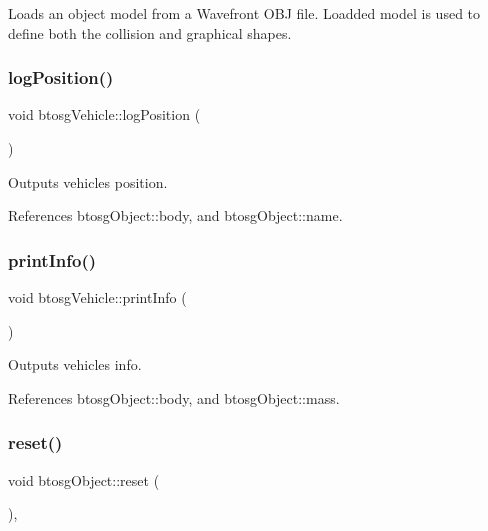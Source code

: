 Loads an object model from a Wavefront O\+BJ file. Loadded model is used to define both the collision and graphical shapes. \mbox{\label{classbtosgVehicle_ae9168c62263b26f95d068d94d6a7cab7}} 
\subsubsection{\texorpdfstring{log\+Position()}{logPosition()}}
{\footnotesize\ttfamily void btosg\+Vehicle\+::log\+Position (\begin{DoxyParamCaption}{ }\end{DoxyParamCaption})\hspace{0.3cm}{\ttfamily [inline]}}

Outputs vehicle\textquotesingle{}s position. 

References btosg\+Object\+::body, and btosg\+Object\+::name.

\mbox{\label{classbtosgVehicle_abe98f64f0a8f37c7c0b244e3afbbcb15}} 
\subsubsection{\texorpdfstring{print\+Info()}{printInfo()}}
{\footnotesize\ttfamily void btosg\+Vehicle\+::print\+Info (\begin{DoxyParamCaption}{ }\end{DoxyParamCaption})\hspace{0.3cm}{\ttfamily [inline]}}

Outputs vehicle\textquotesingle{}s info. 

References btosg\+Object\+::body, and btosg\+Object\+::mass.

\mbox{\label{classbtosgObject_a93983f9180dd0672f8779cf2baa78580}} 
\subsubsection{\texorpdfstring{reset()}{reset()}}
{\footnotesize\ttfamily void btosg\+Object\+::reset (\begin{DoxyParamCaption}{ }\end{DoxyParamCaption})\hspace{0.3cm}{\ttfamily [inline]}, {\ttfamily [inherited]}}


